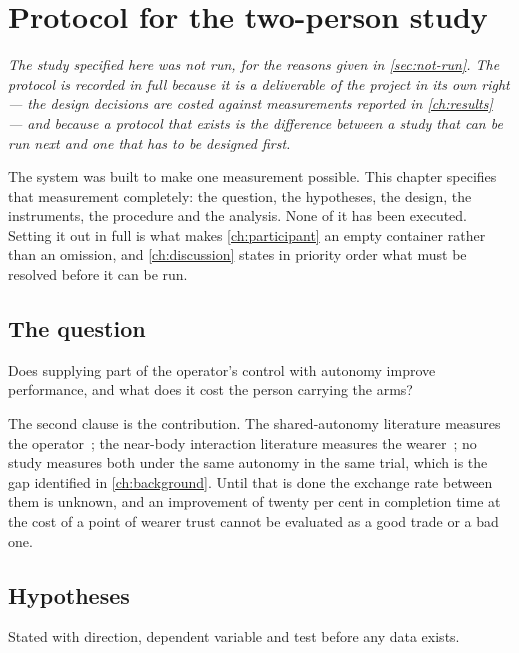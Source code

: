 \chapter{Protocol for the two-person study}
\label{app:study}

\noindent\emph{The study specified here was not run, for the reasons given in
\cref{sec:not-run}. The protocol is recorded in full because it is a
deliverable of the project in its own right --- the design decisions are
costed against measurements reported in \cref{ch:results} --- and because a
protocol that exists is the difference between a study that can be run next
and one that has to be designed first.}

\label{ch:study}

The system was built to make one measurement possible. This chapter specifies
that measurement completely: the question, the hypotheses, the design, the
instruments, the procedure and the analysis. None of it has been executed.
Setting it out in full is what makes \cref{ch:participant} an empty container
rather than an omission, and \cref{ch:discussion} states in priority order
what must be resolved before it can be run.

\section{The question}

Does supplying part of the operator's control with autonomy improve
performance, and what does it cost the person carrying the arms?

The second clause is the contribution. The shared-autonomy literature measures
the operator~\cite{dragan2013policyblending,javdani2015hindsight}; the
near-body interaction literature measures the
wearer~\cite{zhou2026proxemics}; no study measures both under the same
autonomy in the same trial, which is the gap identified in
\cref{ch:background}. Until that is done the exchange rate between them is
unknown, and an improvement of twenty per cent in completion time at the cost
of a point of wearer trust cannot be evaluated as a good trade or a bad one.

\section{Hypotheses}

Stated with direction, dependent variable and test before any data exists.

